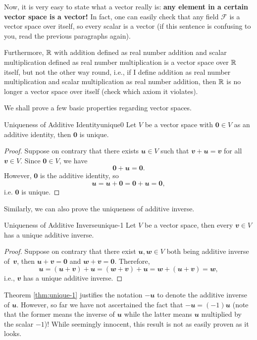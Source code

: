 \documentclass[math, code]{amznotes}
\theoremstyle{remark}
\newcommand{\zero}{\mathbf{0}}
\begin{document}
Now, it is very easy to state what a vector really is: \textbf{any element in a certain vector space is a vector!} In fact, one can easily check that any field $\mathcal{F}$ is a vector space over itself, so every scalar is a vector (if this sentence is confusing to you, read the previous paragraphs again).

Furthermore, $\mathbb{R}$ with addition defined as real number addition and scalar multiplication defined as real number multiplication is a vector space over $\mathbb{R}$ itself, but not the other way round, i.e., if I define addition as real number multiplication and scalar multiplication as real number addition, then $\mathbb{R}$ is no longer a vector space over itself (check which axiom it violates).

We shall prove a few basic properties regarding vector spaces.
\begin{thmbox}{Uniqueness of Additive Identity}{unique0}
    Let $V$ be a vector space with $\zero \in V$ as an additive identity, then $\zero$ is unique.
    \tcblower
    \begin{proof}
        Suppose on contrary that there exists $\mathbfit{u} \in V$ such that $\mathbfit{v + u = v}$ for all $\mathbfit{v} \in V$. Since $\zero \in V$, we have
        \begin{equation*}
            \zero + \mathbfit{u} = \zero.
        \end{equation*}
        However, $\zero$ is the additive identity, so 
        \begin{equation*}
            \mathbfit{u} = \mathbfit{u} + \zero = \zero + \mathbfit{u} = \zero,
        \end{equation*}
        i.e. $\zero$ is unique.
    \end{proof}
\end{thmbox}
Similarly, we can also prove the uniqueness of additive inverse.
\begin{thmbox}{Uniqueness of Additive Inverse}{unique-1}
    Let $V$ be a vector space, then every $\mathbfit{v} \in V$ has a unique additive inverse.
    \tcblower
    \begin{proof}
        Suppose on contrary that there exist $\mathbfit{u, w} \in V$ both being additive inverse of~$\mathbfit{v}$, then $\mathbfit{u + v} = \zero$ and $\mathbfit{w + v} = \zero$. Therefore,
        \begin{equation*}
            \mathbfit{u} = \mathbfit{(u + v) + u} = \mathbfit{(w + v) + u} = \mathbfit{w + (u + v)} = \mathbfit{w},
        \end{equation*}
        i.e., $\mathbfit{v}$ has a unique additive inverse.
    \end{proof}
\end{thmbox}
Theorem \ref{thm:unique-1} justifies the notation $-\mathbfit{u}$ to denote the additive inverse of $\mathbfit{u}$. However, so far we have not ascertained the fact that $-\mathbfit{u} = (-1)\mathbfit{u}$ (note that the former means the inverse of $\mathbfit{u}$ while the latter means $\mathbfit{u}$ multiplied by the scalar $-1$)! While seemingly innocent, this result is not as easily proven as it looks.
\end{document}
